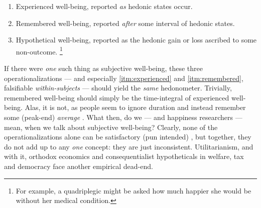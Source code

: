 \begin{enumerate}
	\begin{enumerate}
		\item
			\label{itm:experienced}
		Experienced well-being, reported \emph{as} hedonic states occur.

		\item
			\label{itm:remembered}
		Remembered well-being, reported \emph{after} some interval of hedonic states.

		\item
		Hypothetical well-being, reported as the hedonic gain or loss ascribed to some non-outcome.
		\footnote{
			For example, a quadriplegic might be asked how much happier she would be without her medical condition.
		}
	\end{enumerate}

	If there were \emph{one} such thing as subjective well-being, these three operationalizations --- and especially \ref{itm:experienced} and \ref{itm:remembered}, falsifiable \emph{within-subjects} --- should yield the \emph{same} hedonometer.
	Trivially, remembered well-being should simply be the time-integral of experienced well-being.
	Alas, it is not, as people seem to ignore duration and instead remember some (peak-end) \emph{average} \citep[K7056]{Kahneman2011}.
	What then, do we --- and happiness researchers --- mean, when we talk about subjective well-being? Clearly, none of the operationalizations alone can be satisfactory (pun intended) \citep[see][K7056]{Kahneman2011}, but together, they do not add up to any \emph{one} concept:
	they are just inconsistent.
	Utilitarianism, and with it, orthodox economics and consequentialist hypotheticals in welfare, tax and democracy face another empirical dead-end.
\end{enumerate}


